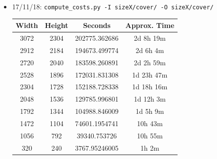 \documentclass[11pt,a4paper]{report}
\begin{document}
\begin{itemize}
\item 17/11/18: \texttt{compute\_costs.py -I sizeX/cover/ -O sizeX/cover/}
  \begin{center}
  \begin{tabular}{ c c | c c }
  Width & Height & Seconds & Approx. Time \\ \hline
  3072 & 2304 & 202775.362686 & 2d 8h 19m \\
  2912 & 2184 & 194673.499774 & 2d 6h 4m \\
  2720 & 2040 & 183598.260891 & 2d 2h 59m \\
  2528 & 1896 & 172031.831308 & 1d 23h 47m \\
  2304 & 1728 & 152188.728338 & 1d 18h 16m \\
  2048 & 1536 & 129785.996801 & 1d 12h 3m \\
  1792 & 1344 & 104988.846009 & 1d 5h 9m \\
  1472 & 1104 & 74601.1954741 & 10h 43m \\
  1056 & 792 & 39340.753726 & 10h 55m \\
  320 & 240 & 3767.95246005 & 1h 2m \\
  \end{tabular}
  \end{center}
\end{itemize}
\end{document}
